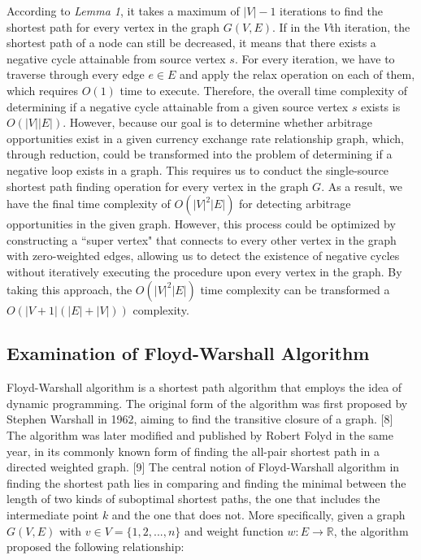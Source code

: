 \documentclass[12pt]{article}
\begin{document}
According to \textit{Lemma 1}, it takes a maximum of $|V| - 1$ iterations to find the shortest path for every vertex in the graph $G(V, E)$. If in the $V$th iteration, the shortest path of a node can still be decreased, it means that there exists a negative cycle attainable from source vertex $s$. For every iteration, we have to traverse through every edge $e \in E$ and apply the relax operation on each of them, which requires $O(1)$ time to execute. Therefore, the overall time complexity of determining if a negative cycle attainable from a given source vertex $s$ exists is $O(|V||E|)$. However, because our goal is to determine whether arbitrage opportunities exist in a given currency exchange rate relationship graph, which, through reduction, could be transformed into the problem of determining if a negative loop exists in a graph. This requires us to conduct the single-source shortest path finding operation for every vertex in the graph $G$. As a result, we have the final time complexity of $O(|V|^2|E|)$ for detecting arbitrage opportunities in the given graph. However, this process could be optimized by constructing a ``super vertex" that connects to every other vertex in the graph with zero-weighted edges, allowing us to detect the existence of negative cycles without iteratively executing the procedure upon every vertex in the graph. By taking this approach, the $O(|V|^2|E|)$ time complexity can be transformed a $O\left(|V+1|(|E|+|V|)\right)$ complexity.

\subsection{Examination of Floyd-Warshall Algorithm}
Floyd-Warshall algorithm is a shortest path algorithm that employs the idea of dynamic programming. The original form of the algorithm was first proposed by Stephen Warshall in 1962, aiming to find the transitive closure of a graph. [8] The algorithm was later modified and published by Robert Folyd in the same year, in its commonly known form of finding the all-pair shortest path in a directed weighted graph. [9] The central notion of Floyd-Warshall algorithm in finding the shortest path lies in comparing and finding the minimal between the length of two kinds of suboptimal shortest paths, the one that includes the intermediate point $k$ and the one that does not. More specifically, given a graph $G(V, E)$ with $v \in V = \{1,2,...,n\}$ and weight function $w:E \rightarrow \mathbb{R}$, the algorithm proposed the following relationship:
\end{document}
